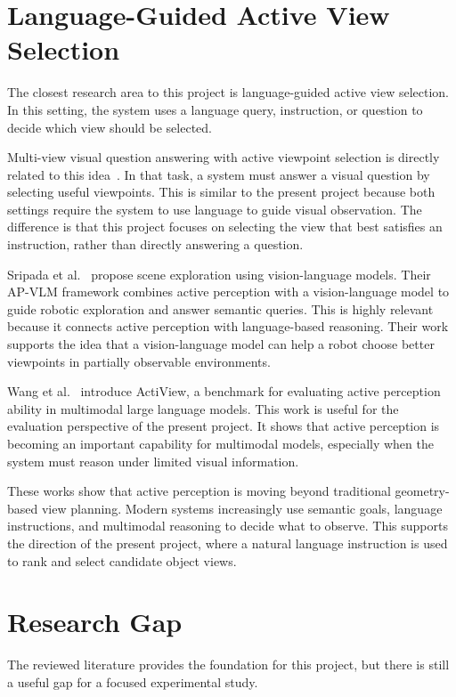 \section{Language-Guided Active View Selection}

The closest research area to this project is language-guided active view selection. In this setting, the system uses a language query, instruction, or question to decide which view should be selected.

Multi-view visual question answering with active viewpoint selection is directly related to this idea~\cite{qiu_multi-view_2020}. In that task, a system must answer a visual question by selecting useful viewpoints. This is similar to the present project because both settings require the system to use language to guide visual observation. The difference is that this project focuses on selecting the view that best satisfies an instruction, rather than directly answering a question.

Sripada et al.~\cite{sripada_scene_2025} propose scene exploration using vision-language models. Their AP-VLM framework combines active perception with a vision-language model to guide robotic exploration and answer semantic queries. This is highly relevant because it connects active perception with language-based reasoning. Their work supports the idea that a vision-language model can help a robot choose better viewpoints in partially observable environments.

Wang et al.~\cite{wang_actiview_2025} introduce ActiView, a benchmark for evaluating active perception ability in multimodal large language models. This work is useful for the evaluation perspective of the present project. It shows that active perception is becoming an important capability for multimodal models, especially when the system must reason under limited visual information.

These works show that active perception is moving beyond traditional geometry-based view planning. Modern systems increasingly use semantic goals, language instructions, and multimodal reasoning to decide what to observe. This supports the direction of the present project, where a natural language instruction is used to rank and select candidate object views.

\section{Research Gap}

The reviewed literature provides the foundation for this project, but there is still a useful gap for a focused experimental study.

